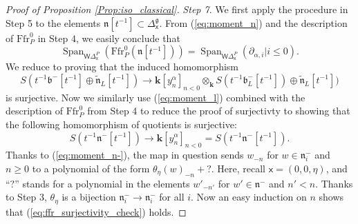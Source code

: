 \documentclass{amsart}
\theoremstyle{definition}
\newcommand{\g}{\mathfrak{g}}
\newcommand{\lf}{\mathfrak{l}}
\newcommand{\bk}{\mathbf{k}}
\newcommand{\WakDelta}{\mathsf{W}\Delta}
\newcommand{\sx}{\mathsf{x}}
\newcommand{\Ffr}{\mathrm{{Ffr}}}
\numberwithin{equation}{section}
\begin{document}
\begin{proof}[Proof of Proposition \ref{Prop:iso_classical}]
{\it Step 7}. We first apply the procedure in Step 5 to the elements 
$\mathfrak{n}[t^{-1}]\subset \Delta^\g_{\sx}$. From (\ref{eq:moment_n}) and the description of $\Ffr^0_P$ in Step 4, we easily conclude  that 
$$\operatorname{Span}_{\WakDelta^P_{\sx}}(\Ffr_P^0(\mathfrak{n}[t^{-1}]))=\operatorname{Span}_{\WakDelta^P_{\sx}}(\partial_{\alpha,i}| i\leqslant 0).$$ We reduce to proving that the induced homomorphism
$$S(t^{-1}\mathfrak{b}^-[t^{-1}]\oplus\tilde{\mathfrak{n}}_L[t^{-1}])
\rightarrow \bk[y^\alpha_n]_{n< 0}\otimes_{\bk} S(t^{-1}\mathfrak{b}^-_L[t^{-1}])\oplus\tilde{\mathfrak{n}}_L[t^{-1}])$$ is surjective. Now we similarly use (\ref{eq:moment_l}) combined with the description of $\Ffr^0_P$ from Step 4 to reduce the proof of surjectivty to showing that the following homomorphism of quotients is surjective:
\begin{equation}\label{eq:ffr_surjectivity_check}
S(t^{-1}\mathfrak{n}^-[t^{-1}])
\rightarrow \bk[y^\alpha_n]_{n< 0}= S(t^{-1}\mathfrak{n}^-[t^{-1}]).
\end{equation}
Thanks to (\ref{eq:moment_n-}), the map in question sends $w_{-n}$ for $w\in \mathfrak{n}^-_i$ and $n\geqslant 0$ to a polynomial of the form 
$\theta_\eta(w)_{-n}+?$. Here, recall $\sx=(0,0,\eta)$, and ``$?$'' stands for a polynomial in the elements $w'_{-n'}$ for $w'\in \mathfrak{n}^-$
and $n'<n$. Thanks to Step 3, $\theta_\eta$ is a bijection $\mathfrak{n}^-_{i}\rightarrow \mathfrak{n}^-_i$ for all $i$. Now an easy induction on $n$ shows that  (\ref{eq:ffr_surjectivity_check}) holds.
\end{proof}

\end{document}
